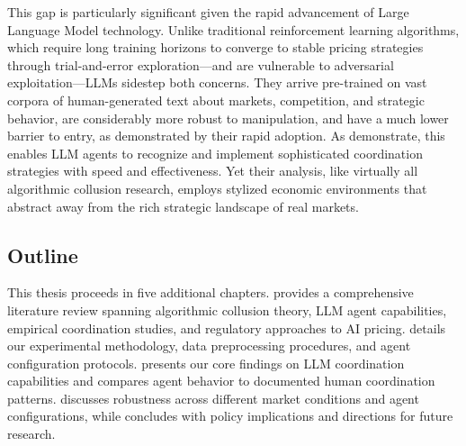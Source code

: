 This gap is particularly significant given the rapid advancement of Large Language Model technology. Unlike traditional reinforcement learning algorithms, which require long training horizons to converge to stable pricing strategies through trial-and-error exploration—and are vulnerable to adversarial exploitation—LLMs sidestep both concerns. They arrive pre-trained on vast corpora of human-generated text about markets, competition, and strategic behavior, are considerably more robust to manipulation, and have a much lower barrier to entry, as demonstrated by their rapid adoption. As \textcite{fish_algorithmic_2025} demonstrate, this enables LLM agents to recognize and implement sophisticated coordination strategies with speed and effectiveness. Yet their analysis, like virtually all algorithmic collusion research, employs stylized economic environments that abstract away from the rich strategic landscape of real markets.

\subsection{Outline}

This thesis proceeds in five additional chapters.  provides a comprehensive literature review spanning algorithmic collusion theory, LLM agent capabilities, empirical coordination studies, and regulatory approaches to AI pricing.  details our experimental methodology, data preprocessing procedures, and agent configuration protocols.  presents our core findings on LLM coordination capabilities and compares agent behavior to documented human coordination patterns.  discusses robustness across different market conditions and agent configurations, while  concludes with policy implications and directions for future research.

